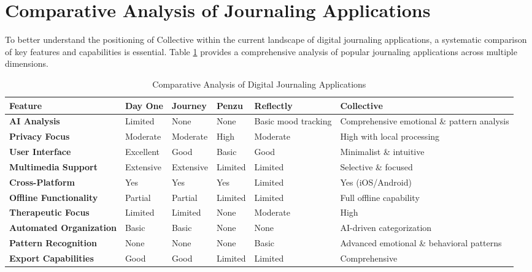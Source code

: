 \section{Comparative Analysis of Journaling Applications}\label{sec:comparative}

To better understand the positioning of Collective within the current landscape of digital journaling applications, a systematic comparison of key features and capabilities is essential. Table \ref{tab:comparison} provides a comprehensive analysis of popular journaling applications across multiple dimensions.

\begin{table}[H]
\centering
\caption{Comparative Analysis of Digital Journaling Applications}
\label{tab:comparison}
\begin{tabular}{|p{2cm}|p{2cm}|p{2cm}|p{2cm}|p{2cm}|p{2cm}|}
\hline
\textbf{Feature} & \textbf{Day One} & \textbf{Journey} & \textbf{Penzu} & \textbf{Reflectly} & \textbf{Collective} \\
\hline
\textbf{AI Analysis} & Limited & None & None & Basic mood tracking & Comprehensive emotional \& pattern analysis \\
\hline
\textbf{Privacy Focus} & Moderate & Moderate & High & Moderate & High with local processing \\
\hline
\textbf{User Interface} & Excellent & Good & Basic & Good & Minimalist \& intuitive \\
\hline
\textbf{Multimedia Support} & Extensive & Extensive & Limited & Limited & Selective \& focused \\
\hline
\textbf{Cross-Platform} & Yes & Yes & Yes & Limited & Yes (iOS/Android) \\
\hline
\textbf{Offline Functionality} & Partial & Partial & Limited & Limited & Full offline capability \\
\hline
\textbf{Therapeutic Focus} & Limited & Limited & None & Moderate & High \\
\hline
\textbf{Automated Organization} & Basic & Basic & None & None & AI-driven categorization \\
\hline
\textbf{Pattern Recognition} & None & None & None & Basic & Advanced emotional \& behavioral patterns \\
\hline
\textbf{Export Capabilities} & Good & Good & Limited & Limited & Comprehensive \\
\hline
\end{tabular}
\end{table}

